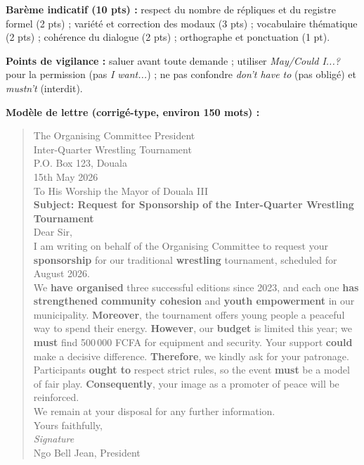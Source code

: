 \documentclass[11pt]{article}
\begin{document}
\begin{corrige}
\textbf{Barème indicatif (10 pts) :} respect du nombre de répliques et du registre formel (2 pts) ; variété et correction des modaux (3 pts) ; vocabulaire thématique (2 pts) ; cohérence du dialogue (2 pts) ; orthographe et ponctuation (1 pt).

\textbf{Points de vigilance :} saluer avant toute demande ; utiliser \emph{May/Could I...?} pour la permission (pas \emph{I want...}) ; ne pas confondre \emph{don't have to} (pas obligé) et \emph{mustn't} (interdit).
\end{corrige}

\begin{corrige}

\textbf{Modèle de lettre (corrigé-type, environ 150 mots) :}

\begin{quote}
The Organising Committee President \\
Inter-Quarter Wrestling Tournament \\
P.O. Box 123, Douala \\
15th May 2026 \\[4pt]
To His Worship the Mayor of Douala III \\[4pt]
\textbf{Subject: Request for Sponsorship of the Inter-Quarter Wrestling Tournament} \\[4pt]
Dear Sir, \\[4pt]
I am writing on behalf of the Organising Committee to request your \textbf{sponsorship} for our traditional \textbf{wrestling} tournament, scheduled for August 2026. \\[4pt]
We \textbf{have organised} three successful editions since 2023, and each one \textbf{has strengthened} \textbf{community cohesion} and \textbf{youth empowerment} in our municipality. \textbf{Moreover}, the tournament offers young people a peaceful way to spend their energy. \textbf{However}, our \textbf{budget} is limited this year; we \textbf{must} find 500\,000 FCFA for equipment and security. Your support \textbf{could} make a decisive difference. \textbf{Therefore}, we kindly ask for your patronage. Participants \textbf{ought to} respect strict rules, so the event \textbf{must} be a model of fair play. \textbf{Consequently}, your image as a promoter of peace will be reinforced. \\[4pt]
We remain at your disposal for any further information. \\[4pt]
Yours faithfully, \\[4pt]
\emph{Signature} \\
Ngo Bell Jean, President
\end{quote}


\end{corrige}
\end{document}
